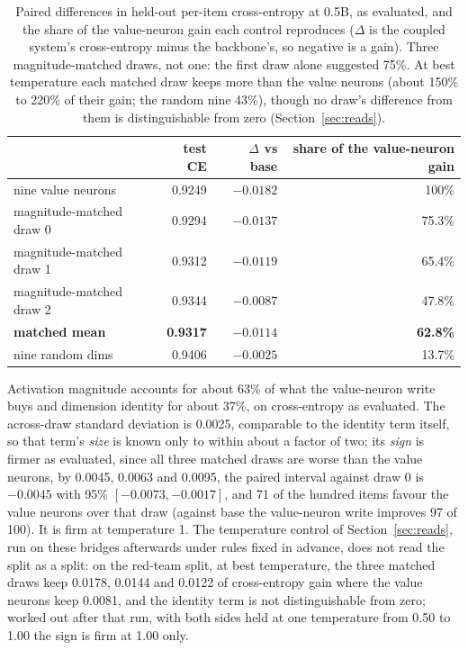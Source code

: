 \documentclass[11pt]{article}
\begin{document}
\begin{table}[t]
\centering
\caption{Paired differences in held-out per-item cross-entropy at 0.5B, as evaluated, and the share of the value-neuron gain each control reproduces ($\Delta$ is the coupled system's cross-entropy minus the backbone's, so negative is a gain). Three magnitude-matched draws, not one: the first draw alone suggested 75\%. At best temperature each matched draw keeps more than the value neurons (about 150\% to 220\% of their gain; the random nine 43\%), though no draw's difference from them is distinguishable from zero (Section~\ref{sec:reads}).}
\label{tab:constpaired}
\small
\begin{tabular}{lrrr}
\toprule
& test CE & $\Delta$ vs base & share of the value-neuron gain \\
\midrule
nine value neurons & 0.9249 & $-0.0182$ & 100\% \\
magnitude-matched draw 0 & 0.9294 & $-0.0137$ & 75.3\% \\
magnitude-matched draw 1 & 0.9312 & $-0.0119$ & 65.4\% \\
magnitude-matched draw 2 & 0.9344 & $-0.0087$ & 47.8\% \\
\textbf{matched mean} & \textbf{0.9317} & $\mathbf{-0.0114}$ & \textbf{62.8\%} \\
nine random dims & 0.9406 & $-0.0025$ & 13.7\% \\
\bottomrule
\end{tabular}
\end{table}

Activation magnitude accounts for about 63\% of what the value-neuron write buys and dimension identity for about 37\%, on cross-entropy as evaluated. The across-draw standard deviation is 0.0025, comparable to the identity term itself, so that term's \emph{size} is known only to within about a factor of two; its \emph{sign} is firmer as evaluated, since all three matched draws are worse than the value neurons, by 0.0045, 0.0063 and 0.0095, the paired interval against draw 0 is $-0.0045$ with 95\% $[-0.0073, -0.0017]$, and 71 of the hundred items favour the value neurons over that draw (against base the value-neuron write improves 97 of 100). It is firm at temperature 1. The temperature control of Section~\ref{sec:reads}, run on these bridges afterwards under rules fixed in advance, does not read the split as a split: on the red-team split, at best temperature, the three matched draws keep 0.0178, 0.0144 and 0.0122 of cross-entropy gain where the value neurons keep 0.0081, and the identity term is not distinguishable from zero; worked out after that run, with both sides held at one temperature from 0.50 to 1.00 the sign is firm at 1.00 only.
\end{document}

